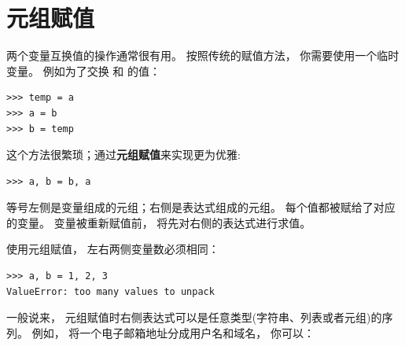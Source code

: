 \section{元组赋值}
\label{tuple.assignment}  
 


两个变量互换值的操作通常很有用。
按照传统的赋值方法， 你需要使用一个临时变量。
例如为了交换 和  的值：

\begin{lstlisting}
>>> temp = a
>>> a = b
>>> b = temp
\end{lstlisting}
%

这个方法很繁琐；通过{\bf 元组赋值}来实现更为优雅:

\begin{lstlisting}
>>> a, b = b, a
\end{lstlisting}
%

等号左侧是变量组成的元组；右侧是表达式组成的元组。
每个值都被赋给了对应的变量。
变量被重新赋值前， 将先对右侧的表达式进行求值。


使用元组赋值， 左右两侧变量数必须相同：

  

\begin{lstlisting}
>>> a, b = 1, 2, 3
ValueError: too many values to unpack
\end{lstlisting}
%

一般说来， 元组赋值时右侧表达式可以是任意类型(字符串、列表或者元组)的序列。  例如， 将一个电子邮箱地址分成用户名和域名， 你可以：

